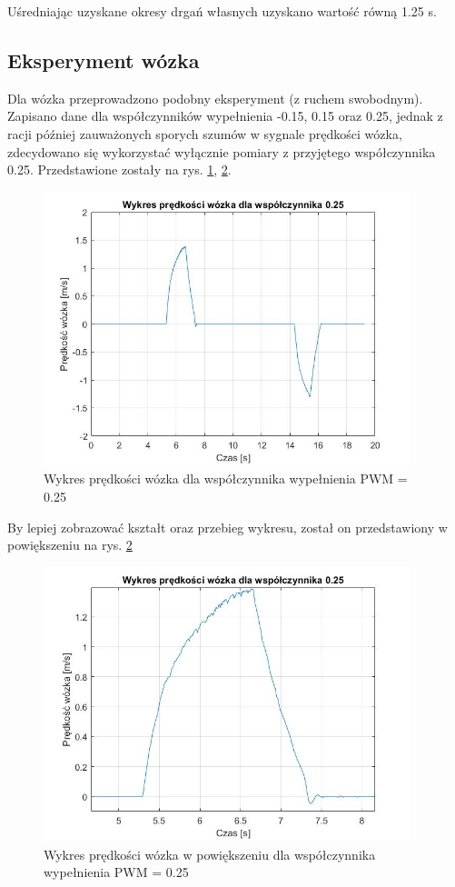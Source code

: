 \documentclass[12pt]{article}
\numberwithin{equation}{section}
\begin{document}
Uśredniając uzyskane okresy drgań własnych uzyskano wartość równą 1.25 s.

\subsection{Eksperyment wózka}

Dla wózka przeprowadzono podobny eksperyment (z ruchem swobodnym). Zapisano dane dla współczynników wypełnienia -0.15, 0.15 oraz 0.25, jednak z racji później zauważonych sporych szumów w sygnale prędkości wózka, zdecydowano się wykorzystać wyłącznie pomiary z przyjętego współczynnika 0.25. Przedstawione zostały na rys. \ref{fig:wozek}, \ref{fig:wozek_zoom}.

\begin{figure}[H]
    \centering
    \includegraphics[width=0.95\textwidth]{wozek.jpg}
    \caption{Wykres prędkości wózka dla współczynnika wypełnienia PWM = 0.25}
    \label{fig:wozek}
\end{figure}

By lepiej zobrazować kształt oraz przebieg wykresu, został on przedstawiony w powiększeniu na rys. \ref{fig:wozek_zoom}

\begin{figure}[H]
    \centering
    \includegraphics[width=0.95\textwidth]{wozek_zoom.jpg}
    \caption{Wykres prędkości wózka w powiększeniu dla współczynnika wypełnienia PWM = 0.25}
    \label{fig:wozek_zoom}
\end{figure}
\end{document}
